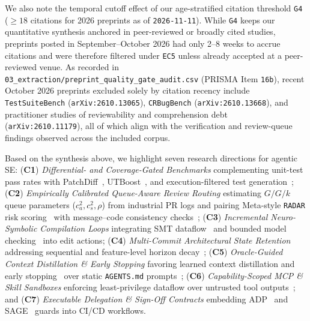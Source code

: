 \documentclass[10pt,twocolumn,a4paper]{article}
\makeatletter
\renewcommand\subsection{\@startsection{subsection}{2}{\z@}{-2.2ex \@plus -0.5ex \@minus -0.2ex}{1.0ex \@plus 0.2ex}{\normalfont\large\bfseries\raggedright}}
\makeatother
\begin{document}
We also note the temporal cutoff effect of our age-stratified citation threshold \texttt{G4} ($\ge 18$ citations for 2026 preprints as of \texttt{2026-11-11}). While \texttt{G4} keeps our quantitative synthesis anchored in peer-reviewed or broadly cited studies, preprints posted in September--October 2026 had only 2--8 weeks to accrue citations and were therefore filtered under \texttt{EC5} unless already accepted at a peer-reviewed venue. As recorded in \texttt{03\_\allowbreak extraction/\allowbreak preprint\_\allowbreak quality\_\allowbreak gate\_\allowbreak audit.\allowbreak csv} (PRISMA Item \texttt{16b}), recent October 2026 preprints excluded solely by citation recency include \texttt{TestSuiteBench} (\texttt{arXiv:2610.13065}), \texttt{CRBugBench} (\texttt{arXiv:2610.13668}), and practitioner studies of reviewability and comprehension debt (\texttt{arXiv:2610.11179}), all of which align with the verification and review-queue findings observed across the included corpus.

\subsection{Seven-Challenge Research Roadmap}
Based on the synthesis above, we highlight seven research directions for agentic SE: (\textbf{C1}) \emph{Differential- and Coverage-Gated Benchmarks} complementing unit-test pass rates with PatchDiff~\cite{wang2025solved}, UTBoost~\cite{yu2025utboost}, and execution-filtered test generation~\cite{alshahwan2024automated}; (\textbf{C2}) \emph{Empirically Calibrated Queue-Aware Review Routing} estimating $G/G/k$ queue parameters ($c_a^2, c_s^2, \rho$) from industrial PR logs and pairing Meta-style \texttt{RADAR} risk scoring~\cite{adams2026automating} with message--code consistency checks~\cite{gong2026analyzing}; (\textbf{C3}) \emph{Incremental Neuro-Symbolic Compilation Loops} integrating SMT dataflow~\cite{wang2024llmdfa} and bounded model checking~\cite{yang2024vert} into edit actions; (\textbf{C4}) \emph{Multi-Commit Architectural State Retention} addressing sequential and feature-level horizon decay~\cite{jin2026chainswe,zhou2026featurebench}; (\textbf{C5}) \emph{Oracle-Guided Context Distillation \& Early Stopping} favoring learned context distillation and early stopping~\cite{jia2026compressing,guo2026eet} over static \texttt{AGENTS.md} prompts~\cite{gloaguen2026evaluating}; (\textbf{C6}) \emph{Capability-Scoped MCP \& Skill Sandboxes} enforcing least-privilege dataflow over untrusted tool outputs~\cite{zhan2024injecagent,andriushchenko2024agentdojo,zhang2025mcp,schmotz2026skillinject}; and (\textbf{C7}) \emph{Executable Delegation \& Sign-Off Contracts} embedding ADP~\cite{arora2026specifying} and SAGE~\cite{feng2026sage} guards into CI/CD workflows.
\end{document}
